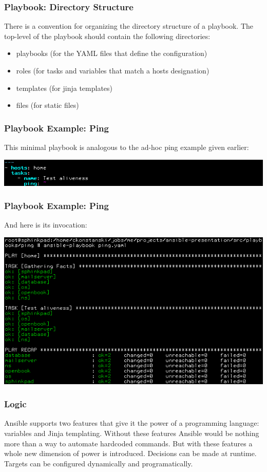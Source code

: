 \documentclass[helvetica,english,utf8,notitle,nologo]{beamer}
\begin{document}
\begin{frame}
  \frametitle{Playbook: Directory Structure}

  There is a convention for organizing the directory structure of a
  playbook. The top-level of the playbook should contain the following
  directories:

  \begin{itemize}
  \item playbooks (for the YAML files that define the configuration)
  \item roles (for tasks and variables that match a hosts designation)
  \item templates (for jinja templates)
  \item files (for static files)
  \end{itemize}
\end{frame}

\begin{frame}
  \frametitle{Playbook Example: Ping}

  This minimal playbook is analogous to the ad-hoc ping example given
  earlier:

  \includegraphics[scale=0.44]{img_6}
\end{frame}

\begin{frame}
  \frametitle{Playbook Example: Ping}

  And here is its invocation:

  \includegraphics[scale=0.44]{img_7}
\end{frame}

\begin{frame}
  \frametitle{Logic}

  Ansible supports two features that give it the power of a
  programming language: variables and Jinja templating. Without these
  features Ansible would be nothing more than a way to automate
  hardcoded commands. But with these features a whole new dimension of
  power is introduced. Decisions can be made at runtime. Targets can
  be configured dynamically and programatically.
\end{frame}
\end{document}
